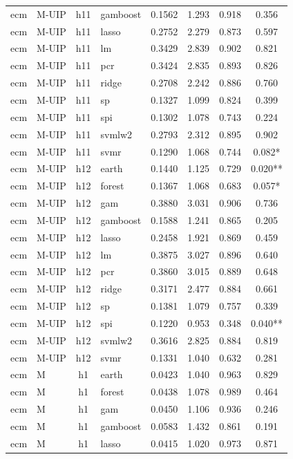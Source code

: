 \begin{ThreePartTable}
\begin{longtable}[t]{llclcccc}
ecm & M-UIP & h11 & gamboost & 0.1562 & 1.293 & 0.918 & 0.356\\
ecm & M-UIP & h11 & lasso & 0.2752 & 2.279 & 0.873 & 0.597\\
ecm & M-UIP & h11 & lm & 0.3429 & 2.839 & 0.902 & 0.821\\
ecm & M-UIP & h11 & pcr & 0.3424 & 2.835 & 0.893 & 0.826\\
ecm & M-UIP & h11 & ridge & 0.2708 & 2.242 & 0.886 & 0.760\\
ecm & M-UIP & h11 & sp & 0.1327 & 1.099 & 0.824 & 0.399\\
ecm & M-UIP & h11 & spi & 0.1302 & 1.078 & 0.743 & 0.224\\
ecm & M-UIP & h11 & svmlw2 & 0.2793 & 2.312 & 0.895 & 0.902\\
ecm & M-UIP & h11 & svmr & 0.1290 & 1.068 & 0.744 & 0.082*\\
\addlinespace
ecm & M-UIP & h12 & earth & 0.1440 & 1.125 & 0.729 & 0.020**\\
ecm & M-UIP & h12 & forest & 0.1367 & 1.068 & 0.683 & 0.057*\\
ecm & M-UIP & h12 & gam & 0.3880 & 3.031 & 0.906 & 0.736\\
ecm & M-UIP & h12 & gamboost & 0.1588 & 1.241 & 0.865 & 0.205\\
ecm & M-UIP & h12 & lasso & 0.2458 & 1.921 & 0.869 & 0.459\\
ecm & M-UIP & h12 & lm & 0.3875 & 3.027 & 0.896 & 0.640\\
ecm & M-UIP & h12 & pcr & 0.3860 & 3.015 & 0.889 & 0.648\\
ecm & M-UIP & h12 & ridge & 0.3171 & 2.477 & 0.884 & 0.661\\
ecm & M-UIP & h12 & sp & 0.1381 & 1.079 & 0.757 & 0.339\\
ecm & M-UIP & h12 & spi & 0.1220 & 0.953 & 0.348 & 0.040**\\
ecm & M-UIP & h12 & svmlw2 & 0.3616 & 2.825 & 0.884 & 0.819\\
ecm & M-UIP & h12 & svmr & 0.1331 & 1.040 & 0.632 & 0.281\\
\addlinespace
ecm & M & h1 & earth & 0.0423 & 1.040 & 0.963 & 0.829\\
ecm & M & h1 & forest & 0.0438 & 1.078 & 0.989 & 0.464\\
ecm & M & h1 & gam & 0.0450 & 1.106 & 0.936 & 0.246\\
ecm & M & h1 & gamboost & 0.0583 & 1.432 & 0.861 & 0.191\\
ecm & M & h1 & lasso & 0.0415 & 1.020 & 0.973 & 0.871\\

\end{longtable}
\end{ThreePartTable}
